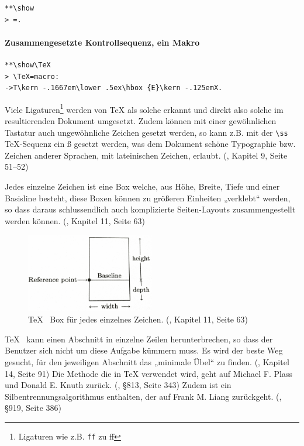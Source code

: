 \begin{verbatim}
**\show
> =.
\end{verbatim}

\paragraph{Zusammengesetzte Kontrollsequenz, ein Makro}

\begin{verbatim}
**\show\TeX
> \TeX=macro:
->T\kern -.1667em\lower .5ex\hbox {E}\kern -.125emX.
\end{verbatim}

Viele Ligaturen\footnote{Ligaturen wie z.B. \lstinline|ff| zu ff}
werden von TeX als solche erkannt und direkt also solche
im resultierenden Dokument umgesetzt. Zudem können mit einer gewöhnlichen
Tastatur auch ungewöhnliche Zeichen gesetzt werden, so kann z.B. mit der
\lstinline|\ss| \TeX-Sequenz ein ß gesetzt werden, was dem Dokument
schöne Typographie bzw. Zeichen anderer Sprachen, mit lateinischen
Zeichen, erlaubt. (\cite{tex-a}, Kapitel 9, Seite 51--52)

Jedes einzelne Zeichen ist eine Box welche, aus Höhe, Breite, Tiefe und
einer Basisline besteht, diese Boxen können
zu größeren Einheiten „verklebt“ werden, so dass daraus schlussendlich
auch komplizierte Seiten-Layouts zusammengestellt werden können.
(\cite{tex-a}, Kapitel 11, Seite 63)

\begin{figure}[h!]
  \centering
    \includegraphics[width=0.5\textwidth]{figures/tex_box.png}
  \caption{\TeX~ Box für jedes einzelnes Zeichen.
           (\cite{tex-a}, Kapitel 11, Seite 63)}\label{fig-tex_box}
\end{figure}

\TeX~ kann einen Abschnitt in einzelne Zeilen herunterbrechen, so dass
der Benutzer sich nicht um diese Aufgabe kümmern muss. Es wird der beste
Weg gesucht, für den jeweiligen Abschnitt das „minimale Übel“ zu finden.
(\cite{tex-a}, Kapitel 14, Seite 91)
Die Methode die in TeX verwendet wird, geht auf Michael F. Plass
und Donald E. Knuth zurück. (\cite{tex-b}, §813, Seite 343)
Zudem ist ein Silbentrennungsalgorithmus enthalten, der auf
Frank M. Liang zurückgeht. (\cite{tex-b}, §919, Seite 386)

